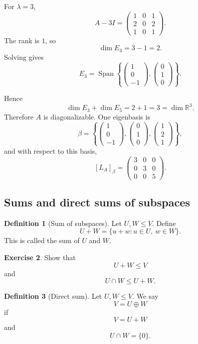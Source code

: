 \documentclass[11pt]{article}
\newcommand{\R}{\mathbb R}
\newcommand{\Span}{\operatorname{Span}}
\theoremstyle{definition}
\newtheorem{definition}{Definition}[section]
\newtheorem{exercise}[definition]{Exercise}
\theoremstyle{plain}
\begin{document}
For $\lambda=3$,
\[
A-3I=
\begin{pmatrix}
1&0&1\\
2&0&2\\
1&0&1
\end{pmatrix}.
\]
The rank is $1$, so
\[
\dim E_3=3-1=2.
\]
Solving gives
\[
E_3=\Span\left\{
\begin{pmatrix}1\\0\\-1\end{pmatrix},
\begin{pmatrix}0\\1\\0\end{pmatrix}
\right\}.
\]

Hence
\[
\dim E_3+\dim E_5=2+1=3=\dim\R^3.
\]
Therefore $A$ is diagonalizable.  One eigenbasis is
\[
\beta=
\left\{
\begin{pmatrix}1\\0\\-1\end{pmatrix},
\begin{pmatrix}0\\1\\0\end{pmatrix},
\begin{pmatrix}1\\2\\1\end{pmatrix}
\right\},
\]
and with respect to this basis,
\[
[L_A]_{\beta}=
\begin{pmatrix}
3&0&0\\
0&3&0\\
0&0&5
\end{pmatrix}.
\]

\subsection{Sums and direct sums of subspaces}

\begin{definition}[Sum of subspaces]
Let $U,W\leq V$.  Define
\[
U+W=\{u+w:u\in U,\ w\in W\}.
\]
This is called the sum of $U$ and $W$.
\end{definition}

\begin{exercise}
Show that
\[
U+W\leq V
\]
and
\[
U\cap W\leq U+W.
\]
\end{exercise}

\begin{definition}[Direct sum]
Let $U,W\leq V$.  We say
\[
V=U\oplus W
\]
if
\[
V=U+W
\]
and
\[
U\cap W=\{0\}.
\]
\end{definition}
\end{document}
